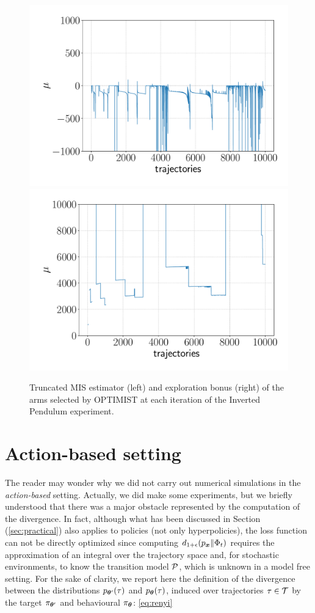 \begin{figure}[t!] 
\centering
\includegraphics[width=.5\textwidth]{Images/IPmise.pdf}\hfill
\includegraphics[width=.5\textwidth]{Images/IPbonus.pdf}
\caption{Truncated \gls{MIS} estimator (left) and exploration bonus (right) of the arms selected by \gls{OPTIMIST} at each iteration of the Inverted Pendulum experiment.} 
\label{fig:IPbound}
\end{figure} 



\section{Action-based setting} \label{sec:actionbased}

The reader may wonder why we did not carry out numerical simulations in the \emph{action-based} setting. Actually, we did make some experiments, but we briefly understood that there was a major obstacle represented by the computation of the \Renyi divergence. In fact, although what has been discussed in Section (\ref{sec:practical}) also applies to policies (not only hyperpolicies), the loss function can not be directly optimized since computing $d_{1+\epsilon}(p_{\boldsymbol{x}}\|\Phi_t)$ requires the approximation of an integral over the trajectory space and, for stochastic environments, to know the transition model $\mathcal{P}$, which is unknown in a model free setting. For the sake of clarity, we report here the definition of the \Renyi divergence between the distributions $p_{\boldsymbol{\theta}'}(\tau)$ and $p_{\boldsymbol{\theta}}(\tau)$, induced over trajectories $\tau\in\mathcal{T}$ by the target $\pi_{\boldsymbol{\theta}'}$ and behavioural $\pi_{\boldsymbol{\theta}}$: \ref{eq:renyi}

